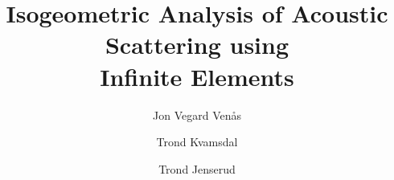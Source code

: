 \label{Part:paperII}
\renewcommand{\contents}{contents/paperII}%
\begin{pFrontmatter}
    \title{Isogeometric Analysis of Acoustic Scattering using\\Infinite Elements}
	\author[a,$\ast$]{Jon Vegard Ven{\aa}s}%
	\author[a]{Trond Kvamsdal}%
	\author[b]{Trond Jenserud}%
	\address[a]{Department of Mathematical Sciences, Norwegian University of Science and Technology,\\Alfred Getz' vei 1, 7034 Trondheim, Norway}%
	\address[b]{Department of Marine Systems, Norwegian Defence Research Establishment,\\Postboks 115, 3191 Horten, Norway}%
	\begin{abstract}%
		
	\end{abstract}%
\end{pFrontmatter}






%
\begin{inputAppendices}




\end{inputAppendices}

